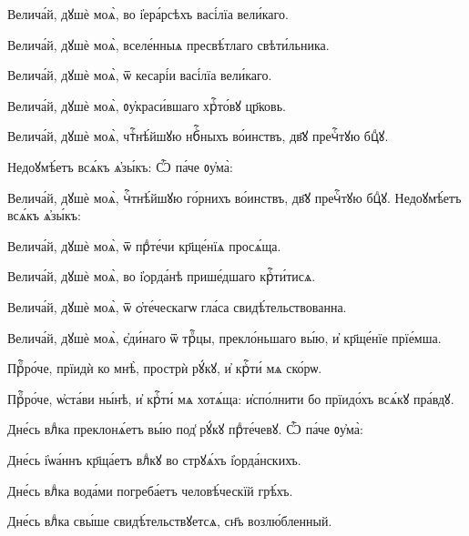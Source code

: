 \hKv Велича́й, дꙋшѐ моѧ̀, во і҆ера́рсѣхъ васі́лїа вели́каго. 

\hKv Велича́й, дꙋшѐ моѧ̀, вселе́нныѧ пресвѣ́тлаго  свѣти́льника.  

\hKv Велича́й, дꙋшѐ моѧ̀, ѿ кесарі́и васі́лїа вели́каго. 

 \hKv Велича́й, дꙋшѐ моѧ̀, ᲂу҆краси́вшаго  хрⷭ҇то́вꙋ цр҃ковь. 

 \hKv Велича́й,  дꙋшѐ моѧ̀, чтⷭ҇нѣ́йшꙋю нбⷭ҇ныхъ во́инствъ, дв҃ꙋ пречⷭ҇тꙋю  бцⷣꙋ. 

\hKv Недоꙋмѣ́етъ всѧ́къ  ѧ҆зы́къ: 
 Ѽ па́че  ᲂу҆ма̀:  


\hKv Велича́й, дꙋшѐ моѧ̀, чⷭ҇тнѣ́йшꙋю го́рнихъ во́инствъ, дв҃ꙋ  пречⷭ҇тꙋю бцⷣꙋ. 
%
 Недоꙋмѣ́етъ всѧ́къ ѧ҆зы́къ:  
%
%

\hKv Велича́й, дꙋшѐ моѧ̀, ѿ прⷣте́чи кр҃ще́нїѧ просѧ́ща. 

\hKv Велича́й, дꙋшѐ моѧ̀, во і҆ѻрда́нѣ прише́дшаго  крⷭ҇ти́тисѧ. 

\hKv Велича́й, дꙋшѐ моѧ̀, ѿ ѻ҆те́ческагѡ гла́са  свидѣ́тельствованна. 

\hKv Велича́й, дꙋшѐ моѧ̀, є҆ди́наго ѿ трⷪ҇цы, прекло́ньшаго  вы́ю, и҆ кр҃ще́нїе прїе́мша. 

\hKv Прⷪ҇ро́че, прїидѝ ко мнѣ̀, прострѝ рꙋ́кꙋ, и҆ крⷭ҇ти́ мѧ  ско́рѡ. 

\hKv Прⷪ҇ро́че, ѡ҆ста́ви ны́нѣ, и҆ крⷭ҇ти́ мѧ хотѧ́ща:  и҆спо́лнити бо прїидо́хъ всѧ́кꙋ пра́вдꙋ. 

%
\hKv Дне́сь влⷣка преклонѧ́етъ вы́ю под̾ рꙋ́кꙋ прⷣте́чевꙋ. 
%
 Ѽ па́че ᲂу҆ма̀: 

%

\hKv Дне́сь і҆ѡа́ннъ кр҃ща́етъ влⷣкꙋ во стрꙋѧ́хъ і҆ѻрда́нскихъ. 

\hKv Дне́сь влⷣка вода́ми погреба́етъ человѣ́ческїй грѣ́хъ. 

\hKv Дне́сь влⷣка свы́ше свидѣ́тельствꙋетсѧ, сн҃ъ  возлю́бленный. 

